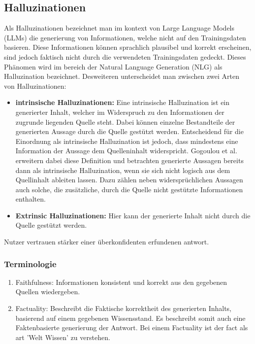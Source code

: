 \subsection{Halluzinationen}
Als Halluzinationen bezeichnet man im kontext von Large Language Models (LLMs) die generierung von Informationen, welche nicht auf den Trainingsdaten basieren.
Diese Informationen können sprachlich plausibel und korrekt erscheinen, sind jedoch faktisch nicht durch die verwendeten Trainingsdaten gedeckt.
Dieses Phänomen wird im bereich der Natural Language Generation (NLG) als Halluzination bezeichnet.\autocite[3]{jiSurveyHallucinationNatural2023}
\newline \noindent
Desweiteren unterscheidet man zwischen zwei Arten von Halluzinationen:
\begin{itemize}
    \item \textbf{intrinsische Halluzinationen:}
          Eine intrinsische Halluzination ist ein generierter Inhalt, welcher im Widerspruch zu den Informationen der zugrunde liegenden Quelle steht. Dabei können einzelne Bestandteile der generierten Aussage durch die Quelle gestützt werden. Entscheidend für die Einordnung als intrinsische Halluzination ist jedoch, dass mindestens eine Information der Aussage dem Quelleninhalt widerspricht. \autocite[3]{jiSurveyHallucinationNatural2023}\newline
          Gogoulou et al. erweitern dabei diese Definition und betrachten generierte Aussagen bereits dann als intrinsische Halluzination, wenn sie sich nicht logisch aus dem Quellinhalt ableiten lassen. Dazu zählen neben widersprüchlichen Aussagen auch solche, die zusätzliche, durch die Quelle nicht gestützte Informationen enthalten. \autocite[1]{gogoulouCanLLMsDetect2025}
    \item \textbf{Extrinsic Halluzinationen:} Hier kann der generierte Inhalt nicht durch die Quelle gestützt werden. \autocite[3]{jiSurveyHallucinationNatural2023}
\end{itemize}

Nutzer vertrauen stärker einer überkonfidenten erfundenen antwort. \autocite[13]{kalaiWhyLanguageModels2025}

\subsubsection{Terminologie}
\begin{enumerate}
    \item Faithfulness: Informationen konsistent und korrekt aus den gegebenen Quellen wiedergeben. \autocite[5]{jiSurveyHallucinationNatural2023}
    \item Factuality: Beschreibt die Faktische korrektheit des generierten Inhalts, basierend auf einem gegebenen Wissensstand.
          Es beschreibt somit auch eine Faktenbasierte generierung der Antwort. Bei einem Factuality ist der fact als art 'Welt Wissen' zu verstehen. \autocite[5]{jiSurveyHallucinationNatural2023}


\end{enumerate}
